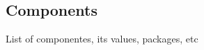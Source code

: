\subsection{Components}\label{02Sub:Components}


List of componentes, its values, packages, etc














